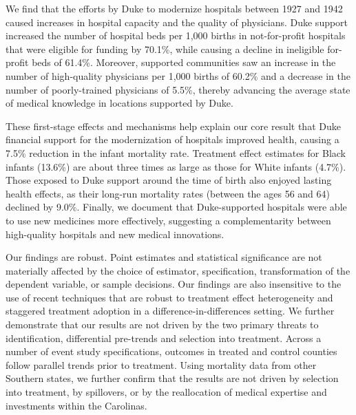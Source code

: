 \documentclass[12pt]{article}
\begin{document}

We find that the efforts by Duke to modernize hospitals between 1927 and 1942 caused increases in hospital capacity and the quality of physicians. 
Duke support increased the number of hospital beds per 1,000 births in not-for-profit hospitals that were eligible for funding by 70.1\%, while causing a decline in ineligible for-profit beds of 61.4\%. 
Moreover, supported communities saw an increase in the number of high-quality physicians per 1,000 births of 60.2\% and a decrease in the number of poorly-trained physicians of 5.5\%, thereby advancing the average state of medical knowledge in locations supported by Duke. 

These first-stage effects and mechanisms help explain our core result that Duke financial support for the modernization of hospitals improved health, causing a 7.5\% reduction in the infant mortality rate. 
Treatment effect estimates for Black infants (13.6\%) are about three times as large as those for White infants (4.7\%). 
Those exposed to Duke support around the time of birth also enjoyed lasting health effects, as their long-run mortality rates (between the ages 56 and 64) declined by 9.0\%. 
Finally, we document that Duke-supported hospitals were able to use new medicines more effectively, suggesting a complementarity between high-quality hospitals and new medical innovations.


Our findings are robust.
Point estimates and statistical significance are not materially affected by the choice of estimator, specification, transformation of the dependent variable, or sample decisions.
Our findings are also insensitive to the use of recent techniques that are robust to treatment effect heterogeneity and staggered treatment adoption in a difference-in-differences setting.
We further demonstrate that our results are not driven by the two primary threats to identification, differential pre-trends and selection into treatment. 
Across a number of event study specifications, outcomes in treated and control counties follow parallel trends prior to treatment. 
Using mortality data from other Southern states, we further confirm that the results are not driven by selection into treatment, by spillovers, or by the reallocation of medical expertise and investments within the Carolinas. 
\end{document}
